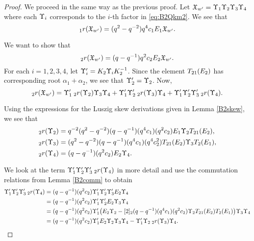 \documentclass[a4 paper, 10pt]{article}
\begin{document}
\begin{proof}
	We proceed in the same way as the previous proof. Let $\mathfrak{X}_{w^{\prime}} = \Upsilon_{1} \Upsilon_{2} \Upsilon_{3} \Upsilon_{4}$ where each $\Upsilon_{i}$ corresponds to the $i$-th factor in \eqref{eq:B2Qkm2}. We see that 
	\begin{equation}
		{}_{1}r(\mathfrak{X}_{w^{\prime}}) = ( q^{ 2 } - q^{ -2 } ) q^{ 4 } c_1 E_1 \mathfrak{X}_{w^{\prime}}.
	\end{equation}

We want to show that
	\begin{equation}
		{}_{2}r(\mathfrak{X}_{w^{\prime}}) = ( q - q^{ -1 } ) q^{ 2 } c_2 E_2 \mathfrak{X}_{w^{\prime}}.
	\end{equation}
For each $i = 1, 2, 3, 4$, let $\Upsilon^{\prime}_{i} = K_2 \Upsilon_{i} K_2^{-1}$. Since the element $T_{21}(E_2)$ has corresponding root  $\alpha_1 + \alpha_2$, we see that $\Upsilon^{\prime}_{2} = \Upsilon_{2}$. Now, 
	\begin{equation}
		{}_{2}r(\mathfrak{X}_{w^{\prime}}) = \Upsilon^{\prime}_{1} \: {}_{2}r(\Upsilon_{2}) \Upsilon_{3} \Upsilon_{4} + \Upsilon^{\prime}_{1} \Upsilon^{\prime}_{2} \: {}_{2}r(\Upsilon_{3}) \Upsilon_{4} + \Upsilon^{\prime}_{1} \Upsilon^{\prime}_{2} \Upsilon^{\prime}_{3} \: {}_{2}r(\Upsilon_{4}).
	\end{equation}

Using the expressions for the Luszig skew derivations given in Lemma \ref{B2skew}, we see that
	\begin{align*}
		{}_{2}r(\Upsilon_{2})	&=	q^{ -2 }( q^{ 2 } - q^{ -2 } )( q - q^{ -1 } ) ( q^{ 4 } c_1 ) ( q^{ 2 } c_2 ) E_1 \Upsilon_{2} T_{21}(E_2),\\
		{}_{2}r(\Upsilon_{3})	&=	( q^{ 2 } - q^{ -2 } )( q - q^{ -1 } ) ( q^{ 4 } c_1 ) ( q^{ 4 } c_2^{ 2 } ) T_{21}(E_2) \Upsilon_{3} T_{2}(E_1),\\
		{}_{2}r(\Upsilon_{4})	&=	( q - q^{ -1 } ) ( q^{ 2 } c_2 ) E_2 \Upsilon_{4}.
	\end{align*}
	
We look at the term $\Upsilon^{\prime}_{1} \Upsilon^{\prime}_{2} \Upsilon^{\prime}_{3} \: {}_{2}r(\Upsilon_{4})$ in more detail and use the commutation relations from Lemma \ref{B2comm} to obtain
	\begin{align*}
		\Upsilon^{\prime}_{1} \Upsilon^{\prime}_{2} \Upsilon^{\prime}_{3} \: {}_{2}r(\Upsilon_{4})	
			&=	( q - q^{ -1 } )( q^{ 2 } c_2 ) \Upsilon^{\prime}_{1} \Upsilon^{\prime}_{2} \Upsilon^{\prime}_{3} E_2 \Upsilon_{4} \\
			&=	( q - q^{ -1 } )( q^{ 2 } c_2 ) \Upsilon^{\prime}_{1} \Upsilon^{\prime}_{2} E_2 \Upsilon_{3} \Upsilon_{4} \\
			&=	( q - q^{ -1 } )( q^{ 2 } c_2 ) \Upsilon^{\prime}_{1} \big( E_2 \Upsilon_{2} - [ 2 ]_{2} ( q - q^{ -1 })( q^{ 4 } c_1)( q^{ 2 } c_2 ) \Upsilon_{2} T_{21}(E_2) T_{2}(E_1) \big) \Upsilon_{3} \Upsilon_{4}\\
			&=	( q - q^{ -1 } )( q^{ 2 } c_2 ) \Upsilon^{\prime}_{1} E_2 \Upsilon_{2} \Upsilon_{3} \Upsilon_{4} - \Upsilon^{\prime}_{1} \Upsilon_{2} \: {}_{2}r(\Upsilon_{3}) \Upsilon_{4}.
	\end{align*}
	

\end{proof}
\end{document}

